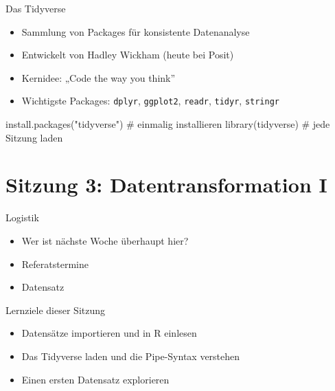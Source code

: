 \documentclass[
  ignorenonframetext,
]{beamer}
\newenvironment{Shaded}{\begin{snugshade}}{\end{snugshade}}
\newcommand{\CommentTok}[1]{\textcolor[rgb]{0.37,0.37,0.37}{#1}}
\newcommand{\FunctionTok}[1]{\textcolor[rgb]{0.28,0.35,0.67}{#1}}
\newcommand{\NormalTok}[1]{\textcolor[rgb]{0.00,0.23,0.31}{#1}}
\newcommand{\StringTok}[1]{\textcolor[rgb]{0.13,0.47,0.30}{#1}}
\providecommand{\tightlist}{%
  \setlength{\itemsep}{0pt}\setlength{\parskip}{0pt}}
\begin{document}
\begin{frame}[fragile]{Das Tidyverse}
\protect{}\label{das-tidyverse}
\begin{itemize}
\tightlist
\item
  Sammlung von Packages für konsistente Datenanalyse
\item
  Entwickelt von Hadley Wickham (heute bei Posit)
\item
  Kernidee: „Code the way you think''
\item
  Wichtigste Packages: \texttt{dplyr}, \texttt{ggplot2}, \texttt{readr},
  \texttt{tidyr}, \texttt{stringr}
\end{itemize}

\begin{Shaded}
\begin{Highlighting}[]
\FunctionTok{install.packages}\NormalTok{(}\StringTok{"tidyverse"}\NormalTok{)  }\CommentTok{\# einmalig installieren}
\FunctionTok{library}\NormalTok{(tidyverse)              }\CommentTok{\# jede Sitzung laden}
\end{Highlighting}
\end{Shaded}
\end{frame}

\section{Sitzung 3: Datentransformation
I}\label{sitzung-3-datentransformation-i}

\begin{frame}{Logistik}
\protect{}\label{logistik}
\begin{itemize}
\tightlist
\item
  Wer ist nächste Woche überhaupt hier?
\item
  Referatstermine
\item
  Datensatz
\end{itemize}
\end{frame}

\begin{frame}{Lernziele dieser Sitzung}
\protect{}\label{lernziele-dieser-sitzung-1}
\begin{itemize}
\tightlist
\item
  Datensätze importieren und in R einlesen
\item
  Das Tidyverse laden und die Pipe-Syntax verstehen
\item
  Einen ersten Datensatz explorieren
\end{itemize}
\end{frame}
\end{document}
